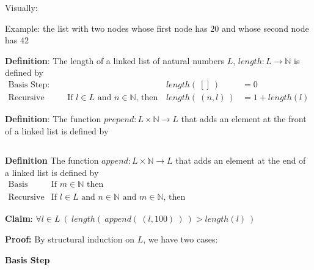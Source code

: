 \documentclass[12pt, oneside]{article}
\begin{document}
Visually:

\vspace{50pt}

Example: the list with two nodes whose first node has $20$ and whose second node
has $42$

\vspace{50pt} 

{\bf Definition}: The length of a linked list of natural numbers $L$, $length: L \to \mathbb{N}$ is defined by
\[
\begin{array}{llll}
\textrm{Basis Step:} &  & length(~[]~) &= 0 \\
\textrm{Recursive Step:} & \textrm{If } l \in L\textrm{ and }n \in \mathbb{N}\textrm{, then  } & length(~(n, l)~)  &= 1+ length(l)
\end{array}
\]
 \vspace{50pt}


{\bf Definition}: The function $prepend : L \times \mathbb{N} \to L$ that adds an element at the 
front of a linked list is defined by
\[
\phantom{prepend(~(l, n)~) = (n, l)}
\]
 \vspace{50pt}


{\bf Definition} The function $append : L \times \mathbb{N} \to L$ that 
adds an element at the end of a linked list is defined by
\[
\begin{array}{llll}
\textrm{Basis Step:} & \textrm{If } m \in \mathbb{N}\textrm{ then } & \phantom{append(~([], m)~)} & \phantom{= (m, []) }\\
\textrm{Recursive Step:} & \textrm{If } l \in L\textrm{ and }n \in \mathbb{N}\textrm{ and }m \in \mathbb{N}\textrm{, then  } & \phantom{append(~(~(n, l), m~)~) } &\phantom{= (n, append(~(l, m)~)~)}
\end{array}
\] \vspace{50pt}
\newpage


{\bf Claim}: $\forall l \in L ~ (~length(~append(~(l, 100)~)~) > length(l)~)$

{\bf Proof:} By structural induction on $L$, we have two cases:

{\bf Basis Step}
\end{document}
